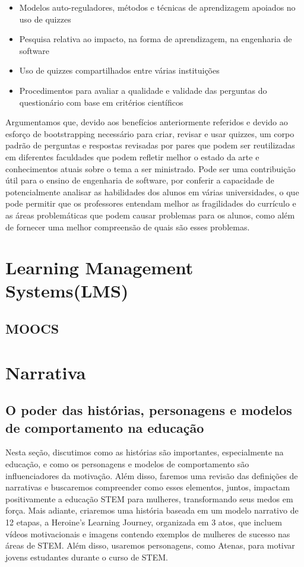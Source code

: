 \begin{itemize}
    \item Modelos auto-reguladores, métodos e técnicas de aprendizagem apoiados no uso de quizzes
    \item Pesquisa relativa ao impacto, na forma de aprendizagem, na engenharia de software
    \item Uso de quizzes compartilhados entre várias instituições
    \item Procedimentos para avaliar a qualidade e validade das perguntas do questionário com base em critérios científicos
\end{itemize}

Argumentamos que, devido aos benefícios anteriormente referidos e devido ao esforço de bootstrapping necessário para criar, revisar e usar quizzes, um corpo padrão de perguntas e respostas revisadas por pares que podem ser reutilizadas em diferentes faculdades que podem refletir melhor o estado da arte e conhecimentos atuais sobre o tema a ser ministrado. Pode ser uma contribuição útil para o ensino de engenharia de software, por conferir a capacidade de potencialmente analisar as habilidades dos alunos em várias universidades, o que pode permitir que os professores entendam melhor as fragilidades do currículo e as áreas problemáticas que podem causar problemas para os alunos, como além de fornecer uma melhor compreensão de quais são esses problemas.


\section{Learning Management Systems(LMS)}

\subsection{MOOCS}


\section{Narrativa}

\subsection{O poder das histórias, personagens e modelos de comportamento na educação}

Nesta seção, discutimos como as histórias são importantes, especialmente na educação, e como os personagens e modelos de comportamento são influenciadores da motivação. Além disso, faremos uma revisão das definições de narrativas e buscaremos compreender como esses elementos, juntos, impactam positivamente a educação STEM para mulheres, transformando seus medos em força. Mais adiante, criaremos uma história baseada em um modelo narrativo de 12 etapas, a Heroine’s Learning Journey, organizada em 3 atos, que incluem vídeos motivacionais e imagens contendo exemplos de mulheres de sucesso nas áreas de STEM. Além disso, usaremos personagens, como Atenas, para motivar jovens estudantes durante o curso de STEM.

